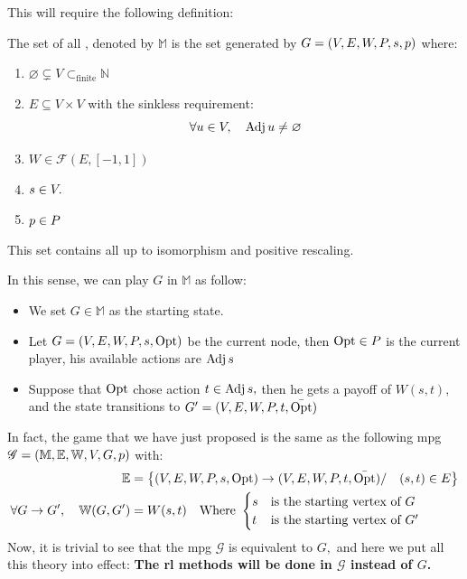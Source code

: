 This will require the following definition:
\begin{definition}
	The set of all , denoted by $\mathbb{M}$ is the set generated by $G=(V,E,W,P,s,p)$ where:
	\begin{enumerate}
		\item $\varnothing\subsetneq V \subset_{\text{finite}} \mathbb{N}$
		\item $E \subseteq V\times V$ with the sinkless requirement:
		\begin{equation*}
			\forall u \in V,\quad \operatorname{Adj} u \neq \varnothing
		\end{equation*}
		\item $W\in\mathscr{F}(E,[-1,1])$
		\item $s\in V.$
		\item $p\in P$
	\end{enumerate}
\end{definition}
	This set contains all  up to isomorphism and positive rescaling.
	
	In this sense, we can play $G$ in $\mathbb{M}$ as follow:
	\begin{itemize}
		\item We set $G\in \mathbb{M}$ as the starting state.
		\item Let $G=(V,E,W,P,s,\operatorname{Opt})$ be the current node, then $\operatorname{Opt}\in P$ is the current player, his available actions are $\operatorname{Adj} s$
		\item Suppose that $\operatorname{Opt}$ chose action $t\in \operatorname{Adj} s,$ then he gets a payoff of $W(s,t),$ and the state transitions to $G'=(V,E,W,P,t,\bar{\operatorname{Opt}})$
	\end{itemize}
	In fact, the game that we have just proposed is the same as the following \acrshort{mpg} $\mathscr{G}=(\mathbb{M},\mathbb{E},\mathbb{W},V,G,p)$ with:
	\begin{align*}
		\mathbb{E}&=\left\{(V,E,W,P,s,\operatorname{Opt})\rightarrow (V,E,W,P,t,\bar{\operatorname{Opt}})/\quad (s,t) \in E\right\} \\
		\forall G\rightarrow G',\quad \mathbb{W}(G,G')&=W(s,t) \quad \text{Where} \ \begin{cases}
			s & \text{is the starting vertex of} \ G \\
			t & \text{is the starting vertex of} \ G'
		\end{cases} 
	\end{align*} 
	Now, it is trivial to see that the \acrshort{mpg} $\mathscr{G}$ is equivalent to $G,$ and here we put all this theory into effect: \textbf{The \acrshort{rl} methods will be done in $\mathscr{G}$ instead of $G$.}
	
